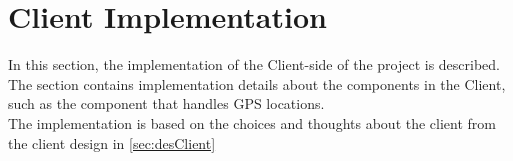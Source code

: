 \section{Client Implementation}
In this section, the implementation of the Client-side of the project is described. The section contains implementation details about the components in the Client, such as the component that handles GPS locations.\\

The implementation is based on the choices and thoughts about the client from the client design in \cref{sec:desClient}
